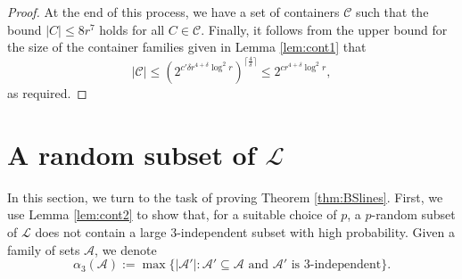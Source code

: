 \documentclass[11pt]{amsart}
\newcommand{\cA}{\mathcal{A}}
\newcommand{\cL}{\mathcal{L}}
\newcommand{\cC}{\mathcal{C}}
\theoremstyle{remark}
\begin{document}
\begin{proof}
    At the end of this process, we have a set of containers $\cC$ such that the bound $|C| \leq 8r^7$ holds for all $C \in \cC$. Finally, it follows from the upper bound for the size of the container families given in Lemma \ref{lem:cont1} that
    \[
    |\cC| \leq \left(2^{c'\delta r^{4+\delta} \log^2 r} \right)^{\lceil \frac{4}{\delta}\rceil } \leq  2^{cr^{4+\delta} \log^2 r},
    \]
as required.
\end{proof}

\section{A random subset of $\cL$}

In this section, we turn to the task of proving Theorem \ref{thm:BSlines}. First, we use Lemma \ref{lem:cont2} to show that, for a suitable choice of $p$, a $p$-random subset of $\mathcal L$ does not contain a large $3$-independent subset with high probability. Given a family of sets $\cA$, we denote
\[
\alpha_3(\cA):= \max \{ |\cA'| : \cA' \subseteq \cA \text{ and } \cA' \text{ is $3$-independent} \}.
\]
\end{document}
